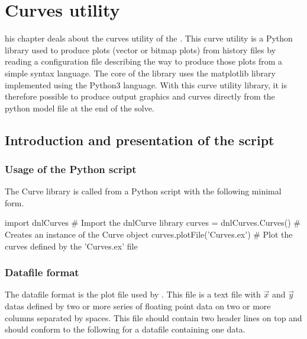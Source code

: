 %
%
%
\chapter{Curves utility}\label{chap:CU!CU}

\startcontents[chapters]
\printmyminitoc[2]

his chapter deals about the curves utility of the \DynELA. This curve utility is a Python library used to produce plots (vector or bitmap plots) from \DynELA history files by reading a configuration file describing the way to produce those plots from a simple syntax language. The core of the library uses the matplotlib library implemented using the Python3 language. With this curve utility library, it is therefore possible to produce output graphics and curves directly from the python model file at the end of the solve.

\section{Introduction and presentation of the script}

\subsection{Usage of the Python script}

The Curve library is called from a Python script with the following minimal form.

\begin{PythonListing}
import dnlCurves              # Import the dnlCurve library
curves = dnlCurves.Curves()   # Creates an instance of the Curve object
curves.plotFile('Curves.ex')  # Plot the curves defined by the 'Curves.ex' file
\end{PythonListing}

\subsection{Datafile format}

The datafile format is the plot file used by \DynELA. This file is a text file with $\overrightarrow{x}$ and $\overrightarrow{y}$ datas defined by two or more series of floating point data on two or more columns separated by spaces. This file should contain two header lines on top and should conform to the following for a datafile containing one data.

